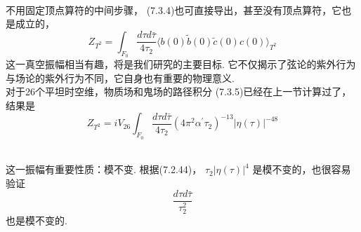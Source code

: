 \\

不用固定顶点算符的中间步骤， (7.3.4)也可直接导出，甚至没有顶点算符，它也是成立的，
\begin{equation}
	Z_{T^{2}}=\int_{F_{0}} \frac{d \tau d \bar{\tau}}{4 \tau_{2}}\langle b(0) \tilde{b}(0) \tilde{c}(0) c(0)\rangle_{T^{2}}
\end{equation}
这一真空振幅相当有趣，将是我们研究的主要目标. 它不仅揭示了弦论的紫外行为与场论的紫外行为不同，它自身也有重要的物理意义.\\
对于26个平坦时空维，物质场和鬼场的路径积分 (7.3.5)已经在上一节计算过了，结果是
\begin{equation}
	Z_{T^{2}}=i V_{26} \int_{F_{0}} \frac{d \tau d \bar{\tau}}{4 \tau_{2}}\left(4 \pi^{2} \alpha^{\prime} \tau_{2}\right)^{-13}|\eta(\tau)|^{-48}
\end{equation}

\\

这一振幅有重要性质：模不变. 根据(7.2.44)， $\tau_{2}|\eta(\tau)|^{4}$ 是模不变的，也很容易验证
\begin{equation}
	\frac{d \tau d \bar{\tau}}{\tau_{2}^{2}}
\end{equation}
也是模不变的.\\

\\

